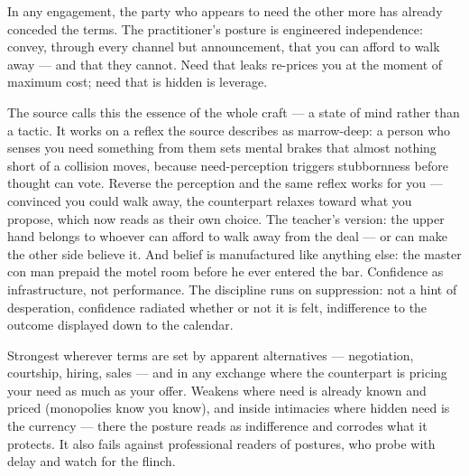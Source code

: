 

\begin{core}
In any engagement, the party who appears to need the other more has already conceded the terms. The practitioner's posture is engineered independence: convey, through every channel but announcement, that you can afford to walk away --- and that they cannot. Need that leaks re-prices you at the moment of maximum cost; need that is hidden is leverage.
\end{core}
\begin{mechanism}
The source calls this the essence of the whole craft --- a state of mind rather than a tactic. It works on a reflex the source describes as marrow-deep: a person who senses you need something from them sets mental brakes that almost nothing short of a collision moves, because need-perception triggers stubbornness before thought can vote. Reverse the perception and the same reflex works for you --- convinced you could walk away, the counterpart relaxes toward what you propose, which now reads as their own choice. The teacher's version: the upper hand belongs to whoever can afford to walk away from the deal --- or can make the other side believe it. And belief is manufactured like anything else: the master con man prepaid the motel room before he ever entered the bar. Confidence as infrastructure, not performance. The discipline runs on suppression: not a hint of desperation, confidence radiated whether or not it is felt, indifference to the outcome displayed down to the calendar.
\end{mechanism}
\begin{conditions}
Strongest wherever terms are set by apparent alternatives --- negotiation, courtship, hiring, sales --- and in any exchange where the counterpart is pricing your need as much as your offer. Weakens where need is already known and priced (monopolies know you know), and inside intimacies where hidden need is the currency --- there the posture reads as indifference and corrodes what it protects. It also fails against professional readers of postures, who probe with delay and watch for the flinch.
\end{conditions}
